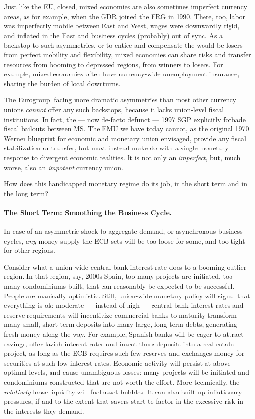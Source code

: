 \documentclass[11pt,a4paper,oneside]{article}
\begin{document}
Just like the \gls{EU}, closed, mixed economies are also sometimes imperfect currency areas, as for example, when the \gls{GDR} joined the \gls{FRG} in 1990.
There, too, labor was imperfectly mobile between East and West, wages were downwardly rigid, and inflated in the East and business cycles (probably) out of sync.
As a backstop to such asymmetries, or to entice and compensate the would-be losers from perfect mobility and flexibility, mixed economies can share risks and transfer resources from booming to depressed regions, from winners to losers.
For example, mixed economies often have currency-wide unemployment insurance, sharing the burden of local downturns.

The Eurogroup, facing more dramatic asymmetries than most other currency unions \emph{cannot} offer any such backstops, because it lacks union-level fiscal institutions.
In fact, the --- now de-facto defunct --- 1997 \gls{SGP} explicitly forbade fiscal bailouts between \gls{MS}.
The \gls{EMU} we have today cannot, as the original 1970 Werner blueprint for economic and monetary union envisaged, provide any fiscal stabilization or transfer, but must instead make do with a single monetary response to divergent economic realities.
It is not only an \emph{imperfect}, but, much worse, also an \emph{impotent} currency union.

How does this handicapped monetary regime do its job, in the short term and in the long term?

\paragraph[Short Term]{The Short Term:
Smoothing the Business Cycle.}
In case of an asymmetric shock to aggregate demand, or asynchronous business cycles, \emph{any} money supply the \gls{ECB} sets will be too loose for some, and too tight for other regions.

Consider what a union-wide central bank interest rate does to a booming outlier region.
In that region, say, 2000s Spain, too many projects are initiated, too many condominiums built, that can reasonably be expected to be successful.
People are manically optimistic.
Still, union-wide monetary policy will signal that everything is ok:
moderate --- instead of high --- central bank interest rates and reserve requirements will incentivize commercial banks to maturity transform many small, short-term deposits into many large, long-term debts, generating fresh money along the way.
For example, Spanish banks will be eager to attract savings, offer lavish interest rates and invest these deposits into a real estate project, as long as the \gls{ECB} requires such few reserves and exchanges money for securities at such low interest rates.
Economic activity will persist at above-optimal levels, and cause unambiguous losses:
many projects will be initiated and condominiums constructed that are not worth the effort.
More technically, the \emph{relatively} loose liquidity will fuel asset bubbles.
It can also built up inflationary pressures, if and to the extent that savers start to factor in the excessive risk in the interests they demand.
\end{document}
